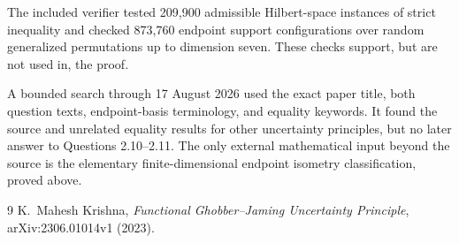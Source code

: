 \documentclass[11pt]{article}
\begin{document}
The included verifier tested 209,900 admissible Hilbert-space instances of
strict inequality and checked 873,760 endpoint support configurations over
random generalized permutations up to dimension seven.  These checks support,
but are not used in, the proof.

A bounded search through 17 August 2026 used the exact paper title, both
question texts, endpoint-basis terminology, and equality keywords.  It found
the source and unrelated equality results for other uncertainty principles,
but no later answer to Questions 2.10--2.11.  The only external mathematical
input beyond the source is the elementary finite-dimensional endpoint
isometry classification, proved above.

\begin{thebibliography}{9}
K.~Mahesh Krishna,
\emph{Functional Ghobber--Jaming Uncertainty Principle},
arXiv:2306.01014v1 (2023).
\end{thebibliography}
\end{document}
